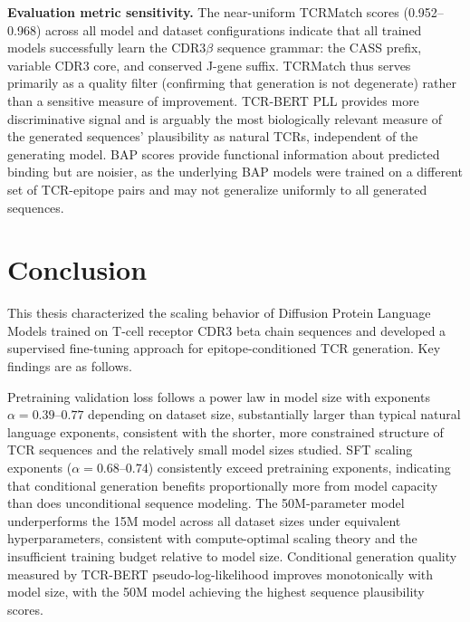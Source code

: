 \documentclass[12pt]{article}
\begin{document}
\textbf{Evaluation metric sensitivity.}
The near-uniform TCRMatch scores (0.952--0.968) across all model and dataset configurations
indicate that all trained models successfully learn the CDR3$\beta$ sequence grammar: the
CASS prefix, variable CDR3 core, and conserved J-gene suffix. TCRMatch thus serves primarily
as a quality filter (confirming that generation is not degenerate) rather than a sensitive
measure of improvement. TCR-BERT PLL provides more discriminative signal and is arguably the
most biologically relevant measure of the generated sequences' plausibility as natural TCRs,
independent of the generating model. BAP scores provide functional information about predicted
binding but are noisier, as the underlying BAP models were trained on a different set of
TCR-epitope pairs and may not generalize uniformly to all generated sequences.

\section{Conclusion}

This thesis characterized the scaling behavior of Diffusion Protein Language Models trained
on T-cell receptor CDR3 beta chain sequences and developed a supervised fine-tuning approach
for epitope-conditioned TCR generation. Key findings are as follows.

Pretraining validation loss follows a power law in model size with exponents
$\alpha = 0.39$--$0.77$ depending on dataset size, substantially larger than typical
natural language exponents, consistent with the shorter, more constrained structure of TCR
sequences and the relatively small model sizes studied. SFT scaling exponents ($\alpha =
0.68$--$0.74$) consistently exceed pretraining exponents, indicating that conditional
generation benefits proportionally more from model capacity than does unconditional sequence
modeling. The 50M-parameter model underperforms the 15M model across all dataset sizes under
equivalent hyperparameters, consistent with compute-optimal scaling theory and the
insufficient training budget relative to model size. Conditional generation quality measured by
TCR-BERT pseudo-log-likelihood improves monotonically with model size, with the 50M model
achieving the highest sequence plausibility scores.
\end{document}
